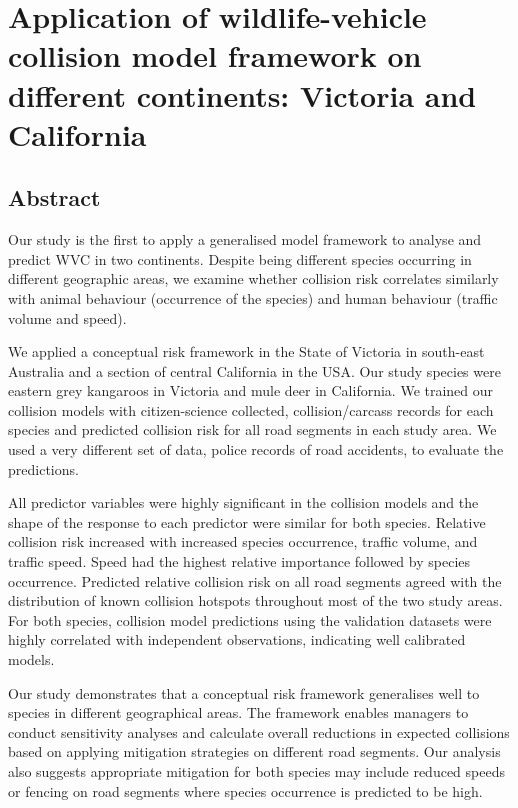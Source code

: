 \chapter{Application of wildlife-vehicle collision model framework on different continents: Victoria and California}\label{sec:cal}
\newpage

\begin{localsize}{10}
\section*{\centering Abstract}

Our study is the first to apply a generalised model framework to analyse and predict WVC in two continents. Despite being different species occurring in different geographic areas, we examine whether collision risk correlates similarly with animal behaviour (occurrence of the species) and human behaviour (traffic volume and speed).

We applied a conceptual risk framework in the State of Victoria in south-east Australia and a section of central California in the USA. Our study species were eastern grey kangaroos in Victoria and mule deer in California. We trained our collision models with citizen-science collected, collision/carcass records for each species and predicted collision risk for all road segments in each study area.  We used a very different set of data, police records of road accidents, to evaluate the predictions.

All predictor variables were highly significant in the collision models and the shape of the response to each predictor were similar for both species.  Relative collision risk increased with increased species occurrence, traffic volume, and traffic speed. Speed had the highest relative importance followed by species occurrence. Predicted relative collision risk on all road segments agreed with the distribution of known collision hotspots throughout most of the two study areas. For both species, collision model predictions using the validation datasets were highly correlated with independent observations, indicating well calibrated models.

Our study demonstrates that a conceptual risk framework generalises well to species in different geographical areas. The framework enables managers to conduct sensitivity analyses and calculate overall reductions in expected collisions based on applying mitigation strategies on different road segments. Our analysis also suggests appropriate mitigation for both species may include reduced speeds or fencing on road segments where species occurrence is predicted to be high.

\end{localsize}

